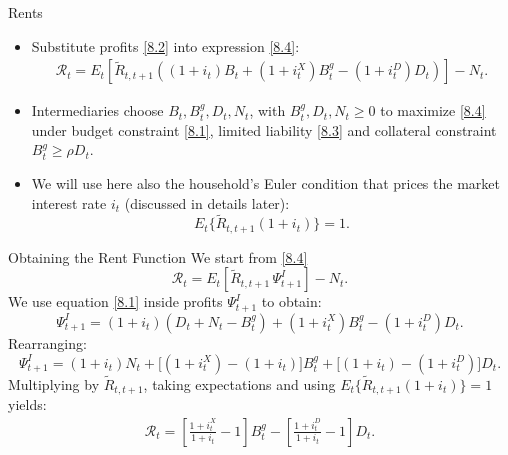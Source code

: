 \documentclass[11pt,aspectratio=169]{beamer}
\begin{document}
\begin{frame}{Rents}
  \begin{itemize}
    \item Substitute profits \eqref{8.2} into expression \eqref{8.4}:
\begin{align*}
    \mathcal{R}_t
      = E_t\!\left[
        \tilde{R}_{t,t+1}\left(
          (1+i_t) B_t
          + (1+i_t^X) B_t^g
          - (1+i_t^D) D_t
        \right)\right] - N_t.
\end{align*}
\vspace{0.1cm}
\item Intermediaries choose $B_t, B_t^g, D_t, N_t$, with $B_t^g, D_t, N_t \ge 0$ to maximize \eqref{8.4} under budget constraint \eqref{8.1}, limited liability \eqref{8.3} and collateral constraint $B_t^g \ge \rho D_t$.
\vspace{0.3cm}
\item We will use here also the household's Euler condition that prices the market interest rate $i_t$ (discussed in details later):
$$E_t\{\tilde{R}_{t,t+1} (1+i_t)\} = 1.$$
  \end{itemize}
\end{frame}

\begin{frame}{Obtaining the Rent Function}
  We start from \eqref{8.4}
$$\mathcal{R}_t
    = E_t\!\left[ \tilde{R}_{t,t+1}\,\Psi_{t+1}^I \right] - N_t.$$
  We use equation \eqref{8.1} inside profits $\Psi_{t+1}^I$ to obtain:
$$\Psi_{t+1}^I
    = (1+i_t)(D_t + N_t - B_t^g)
      + (1+i_t^X) B_t^g
      - (1+i_t^D) D_t.$$
  Rearranging:
$$\Psi_{t+1}^I
    = (1+i_t)N_t
      + \big[(1+i_t^X) - (1+i_t)\big] B_t^g
      + \big[(1+i_t) - (1+i_t^D)\big] D_t.$$
  Multiplying by $\tilde{R}_{t,t+1}$, taking expectations and using 
  $E_t\{\tilde{R}_{t,t+1} (1+i_t)\}=1$ yields: 
\begin{align}
    \mathcal{R}_t
    = \left[ \frac{1+i_t^X}{1+i_t} - 1\right] B_t^g
      - \left[ \frac{1+i_t^D}{1+i_t} - 1\right] D_t.\label{8.5}
\end{align}
\end{frame}
\end{document}
